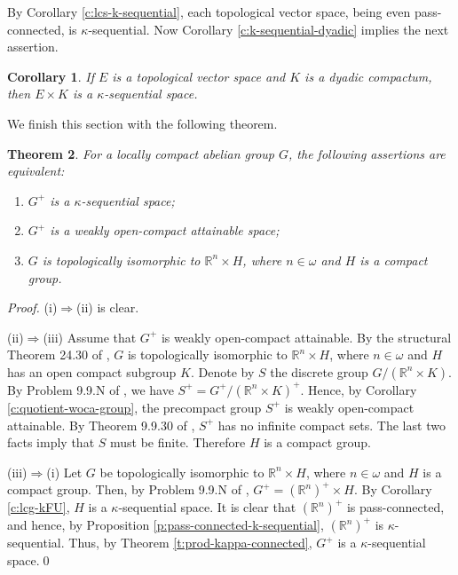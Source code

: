 \documentclass[preprint,11pt]{elsarticle}
\newtheorem{theorem}{Theorem}[section]
\newtheorem{corollary}[theorem]{Corollary}
\numberwithin{equation}{section}
\numberwithin{theorem}{section}
\newcommand{\w}{\omega}
\newcommand{\IR}{\mathbb{R}}
\newcommand{\Ra}{\Rightarrow}
\begin{document}
By Corollary \ref{c:lcs-k-sequential}, each topological vector space, being even pass-connected, is $\kappa$-sequential. Now Corollary \ref{c:k-sequential-dyadic} implies the next assertion.
\begin{corollary} \label{c:tvs-dyadic-product}
If $E$ is a topological vector space and $K$ is a dyadic compactum, then $E\times K$ is a $\kappa$-sequential space.
\end{corollary}

We finish this section with the following theorem.

\begin{theorem} \label{t:LCA-Bohr-woca}
For a locally compact abelian group $G$, the following assertions are equivalent:
\begin{enumerate}
\item[{\rm(i)}] $G^+$ is a $\kappa$-sequential space;
\item[{\rm(ii)}] $G^+$ is a weakly open-compact attainable space;
\item[{\rm(iii)}] $G$ is topologically isomorphic to $\IR^n\times H$, where $n\in\w$ and $H$ is a compact group.
\end{enumerate}
\end{theorem}

\begin{proof}
(i)$\Ra$(ii) is clear.
\smallskip

(ii)$\Ra$(iii) Assume that $G^+$ is weakly open-compact attainable. By the structural Theorem 24.30 of \cite{HR1}, $G$ is topologically isomorphic to  $\IR^n\times H$, where $n\in\w$ and $H$ has  an open compact subgroup $K$. Denote by $S$ the discrete group $G/(\IR^n\times K)$.  By Problem 9.9.N of \cite{ArT}, we have $S^+=G^+/(\IR^n\times K)^+$. Hence, by Corollary \ref{c:quotient-woca-group}, the precompact group $S^+$ is weakly open-compact attainable. By Theorem 9.9.30 of \cite{ArT}, $S^+$ has no infinite compact sets. The last two facts imply that $S$ must be finite. Therefore $H$ is a compact group.
\smallskip

(iii)$\Ra$(i) Let $G$ be topologically isomorphic to  $\IR^n\times H$, where $n\in\w$ and $H$ is a compact group. Then, by Problem 9.9.N of \cite{ArT}, $G^+=(\IR^n)^+\times H$. By Corollary  \ref{c:lcg-kFU},  $H$ is a $\kappa$-sequential space. It is clear that $(\IR^n)^+$ is pass-connected, and hence, by Proposition \ref{p:pass-connected-k-sequential},  $(\IR^n)^+$ is $\kappa$-sequential. Thus, by Theorem  \ref{t:prod-kappa-connected}, $G^+$ is a $\kappa$-sequential space.\qed
\end{proof}
\end{document}
